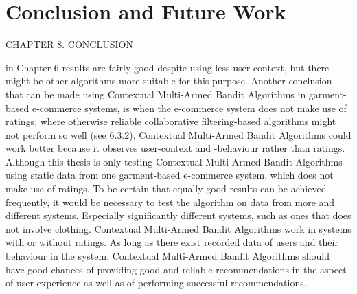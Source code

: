 \chapter{Conclusion and Future Work}

CHAPTER 8. CONCLUSION

in Chapter 6 results are fairly good despite using less user context, but there might be
other algorithms more suitable for this purpose.
Another conclusion that can be made using Contextual Multi-Armed Bandit Algorithms
in garment-based e-commerce systems, is when the e-commerce system does not make
use of ratings, where otherwise reliable collaborative filtering-based algorithms might
not perform so well (see 6.3.2), Contextual Multi-Armed Bandit Algorithms could work
better because it observes user-context and -behaviour rather than ratings. Although
this thesis is only testing Contextual Multi-Armed Bandit Algorithms using static data
from one garment-based e-commerce system, which does not make use of ratings. To
be certain that equally good results can be achieved frequently, it would be necessary
to test the algorithm on data from more and different systems. Especially significantly
different systems, such as ones that does not involve clothing.
Contextual Multi-Armed Bandit Algorithms work in systems with or without ratings.
As long as there exist recorded data of users and their behaviour in the system, Contextual Multi-Armed Bandit Algorithms should have good chances of providing good
and reliable recommendations in the aspect of user-experience as well as of performing
successful recommendations.
